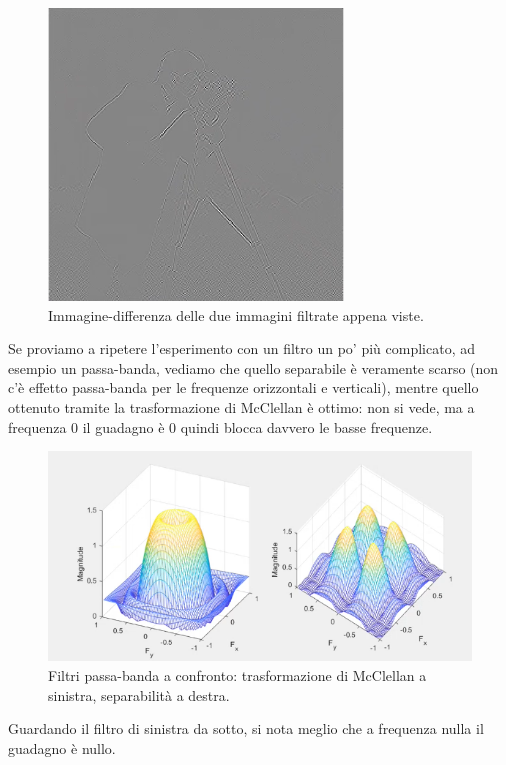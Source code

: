 \documentclass[a4paper,11pt]{article}
\begin{document}
\renewcommand{\thefigure}{6.9}
\begin{figure}[!h]
  \centering
    \includegraphics[scale=0.45]{images/6/diff_mcclellan_sep.png}
    \caption{Immagine-differenza delle due immagini filtrate appena viste.}
\end{figure}

Se proviamo a ripetere l'esperimento con un filtro un po' più complicato, ad esempio un passa-banda, vediamo che quello separabile è veramente
scarso (non c'è effetto passa-banda per le frequenze orizzontali e verticali), mentre quello ottenuto tramite la trasformazione di McClellan è ottimo: non si
vede, ma a frequenza 0 il guadagno è 0 quindi blocca davvero le basse frequenze.

\renewcommand{\thefigure}{6.10}
\begin{figure}[!h]
  \centering
    \includegraphics[scale=0.6]{images/6/bandpass_mcclellan_vs_sep.png}
    \caption{Filtri passa-banda a confronto: trasformazione di McClellan a sinistra, separabilità a destra.}
\end{figure}

Guardando il filtro di sinistra da sotto, si nota meglio che a frequenza nulla il guadagno è nullo.
\end{document}
